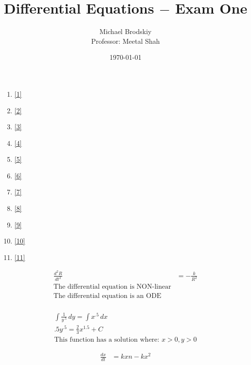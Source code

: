 \documentclass[12pt]{article}
\title{Differential Equations $-$ Exam One}
\date{\today}
\author{Michael Brodskiy\\ \small Professor: Meetal Shah}
\begin{document}
\maketitle

\begin{enumerate}

  \item \eqref{1}

  \item \eqref{2}

  \item \eqref{3}

  \item \eqref{4} 

  \item \eqref{5}

  \item \eqref{6}

  \item \eqref{7}

  \item \eqref{8}

  \item \eqref{9}

  \item \eqref{10}

  \item \eqref{11}

\end{enumerate}

\hline
\begin{equation}
  \begin{split}
    \frac{d^2R}{dt^2} & = -\frac{k}{R^2} \\
    \text{The differential equation is NON-linear}\\ 
    \text{The differential equation is an ODE}\\
  \end{split}
  \label{1}
\end{equation}
\hline

\begin{equation}
  \begin{split}
    \int \frac{1}{y^{.5}}\,dy=\int x^{.5}\,dx\\
    .5y^{.5}=\frac{2}{3}x^{1.5}+C \\
    \text{This function has a solution where: } x > 0, y > 0
  \end{split}
  \label{2}
\end{equation}

\hline
\begin{equation}
  \begin{split}
    \frac{dx}{dt} & = kxn-kx^2 \\
  \end{split}
  \label{3}
\end{equation}
\end{document}
